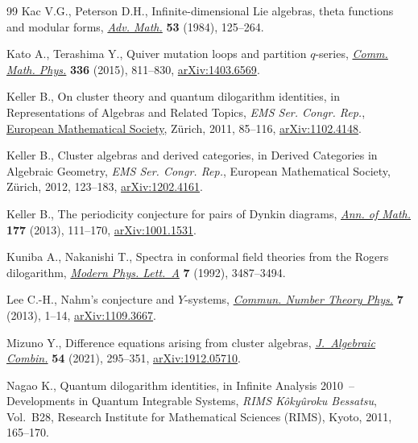 \begin{thebibliography}{99}
Kac V.G., Peterson D.H., Infinite-dimensional {L}ie algebras, theta functions
 and modular forms,
 \href{https://doi.org/10.1016/0001-8708(84)90032-X}{\textit{Adv. Math.}}
 \textbf{53} (1984), 125--264.

Kato A., Terashima Y., Quiver mutation loops and partition {$q$}-series,
 \href{https://doi.org/10.1007/s00220-014-2224-5}{\textit{Comm. Math. Phys.}}
 \textbf{336} (2015), 811--830,
 \href{http://arxiv.org/abs/1403.6569}{arXiv:1403.6569}.

Keller B., On cluster theory and quantum dilogarithm identities, in
 Representations of {A}lgebras and {R}elated {T}opics, \textit{EMS Ser. Congr. Rep.},
 \href{https://doi.org/10.4171/101-1/3}{European Mathematical Society},
 Z\"urich, 2011, 85--116,
 \href{http://arxiv.org/abs/1102.4148}{arXiv:1102.4148}.

Keller B., Cluster algebras and derived categories, in Derived {C}ategories in
 {A}lgebraic {G}eometry, \textit{EMS Ser. Congr. Rep.}, European Mathematical Society,
 Z\"urich, 2012, 123--183,
 \href{http://arxiv.org/abs/1202.4161}{arXiv:1202.4161}.

Keller B., The periodicity conjecture for pairs of {D}ynkin diagrams,
 \href{https://doi.org/10.4007/annals.2013.177.1.3}{\textit{Ann. of Math.}}
 \textbf{177} (2013), 111--170,
 \href{http://arxiv.org/abs/1001.1531}{arXiv:1001.1531}.

Kuniba A., Nakanishi T., Spectra in conformal field theories from the {R}ogers
 dilogarithm, \href{https://doi.org/10.1142/S0217732392002895}{\textit{Modern
 Phys. Lett.~A}} \textbf{7} (1992), 3487--3494.

Lee C.-H., Nahm's conjecture and {$Y$}-systems,
 \href{https://doi.org/10.4310/CNTP.2013.v7.n1.a1}{\textit{Commun. Number
 Theory Phys.}} \textbf{7} (2013), 1--14,
 \href{http://arxiv.org/abs/1109.3667}{arXiv:1109.3667}.

Mizuno Y., Difference equations arising from cluster algebras,
 \href{https://doi.org/10.1007/s10801-020-00978-9}{\textit{J.~Algebraic
 Combin.}} \textbf{54} (2021), 295--351,
 \href{http://arxiv.org/abs/1912.05710}{arXiv:1912.05710}.

Nagao K., Quantum dilogarithm identities, in Infinite {A}nalysis 2010~--
 {D}evelopments in {Q}uantum {I}ntegrable {S}ystems, \textit{RIMS K\^oky\^uroku
 Bessatsu}, Vol.~B28, Research Institute for Mathematical Sciences (RIMS), Kyoto,
 2011, 165--170.


\end{thebibliography}
